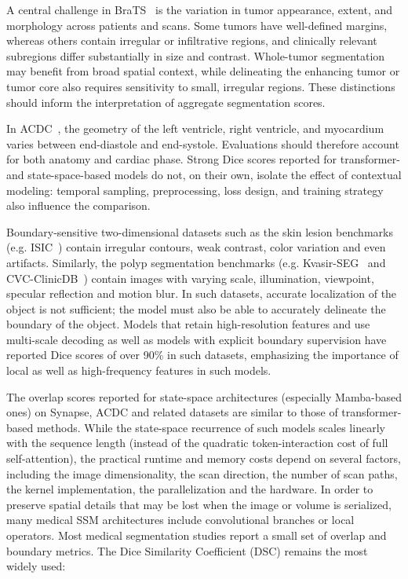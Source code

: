 \documentclass[5p,times,authoryear]{elsarticle}
\begin{document}
A central challenge in BraTS~\citep{menze2015multimodal} is the variation in tumor appearance, extent, and morphology across patients and scans. Some tumors have well-defined margins, whereas others contain irregular or infiltrative regions, and clinically relevant subregions differ substantially in size and contrast. Whole-tumor segmentation may benefit from broad spatial context, while delineating the enhancing tumor or tumor core also requires sensitivity to small, irregular regions. These distinctions should inform the interpretation of aggregate segmentation scores.

In ACDC~\citep{bernard2018deep}, the geometry of the left ventricle, right ventricle, and myocardium varies between end-diastole and end-systole. Evaluations should therefore account for both anatomy and cardiac phase. Strong Dice scores reported for transformer- and state-space-based models do not, on their own, isolate the effect of contextual modeling: temporal sampling, preprocessing, loss design, and training strategy also influence the comparison.

Boundary-sensitive two-dimensional datasets such as the skin lesion benchmarks (e.g. ISIC~\citep{codella2019skin}) contain irregular contours, weak contrast, color variation and even artifacts. Similarly, the polyp segmentation benchmarks (e.g. Kvasir-SEG~\citep{jha2019kvasir} and CVC-ClinicDB~\citep{bernal2015wm}) contain images with varying scale, illumination, viewpoint, specular reflection and motion blur. In such datasets, accurate localization of the object is not sufficient; the model must also be able to accurately delineate the boundary of the object. Models that retain high-resolution features and use multi-scale decoding as well as models with explicit boundary supervision have reported Dice scores of over 90\% in such datasets, emphasizing the importance of local as well as high-frequency features in such models.

The overlap scores reported for state-space architectures (especially Mamba-based ones) on Synapse, ACDC and related datasets are similar to those of transformer-based methods. While the state-space recurrence of such models scales linearly with the sequence length (instead of the quadratic token-interaction cost of full self-attention), the practical runtime and memory costs depend on several factors, including the image dimensionality, the scan direction, the number of scan paths, the kernel implementation, the parallelization and the hardware. In order to preserve spatial details that may be lost when the image or volume is serialized, many medical SSM architectures include convolutional branches or local operators. 
Most medical segmentation studies report a small set of overlap and boundary metrics. The Dice Similarity Coefficient (DSC) remains the most widely used:
\end{document}
